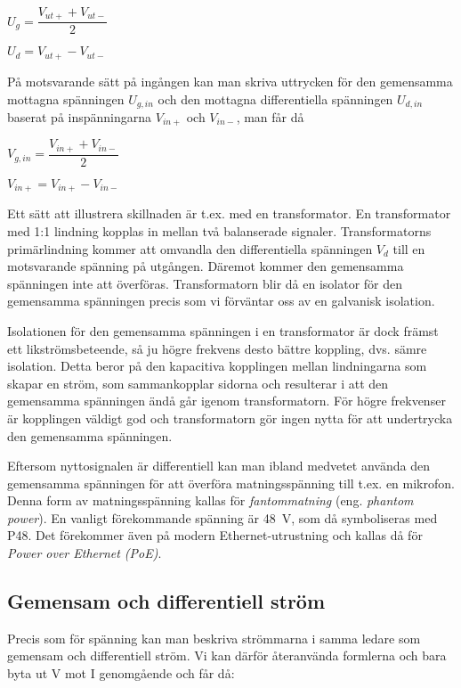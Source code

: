 \(U_g = \dfrac{V_{ut+}+V_{ut-}}{2}\)

\(U_d = {V_{ut+}-V_{ut-}}\)

På motsvarande sätt på ingången kan man skriva uttrycken för den gemensamma
mottagna spänningen \(U_{g,in}\) och den mottagna differentiella spänningen
\(U_{d,in}\) baserat på inspänningarna \(V_{in+}\) och \(V_{in-}\), man får då

\(V_{g,in} = \dfrac{V_{in+} + V_{in-}}{2}\)

\(V_{in+} = V_{in+}-V_{in-}\)

Ett sätt att illustrera skillnaden är t.ex. med en transformator.
En transformator med 1:1 lindning kopplas in mellan två balanserade signaler.
Transformatorns primärlindning kommer att omvandla den differentiella spänningen
\(V_d\) till en motsvarande spänning på utgången.
Däremot kommer den gemensamma spänningen inte att överföras.
Transformatorn blir då en isolator för den gemensamma spänningen precis som vi
förväntar oss av en galvanisk isolation.

Isolationen för den gemensamma spänningen i en transformator är dock främst ett
likströmsbeteende, så ju högre frekvens desto bättre koppling, dvs. sämre
isolation.
Detta beror på den kapacitiva kopplingen mellan lindningarna som skapar en
ström, som sammankopplar sidorna och resulterar i att den gemensamma spänningen
ändå går igenom transformatorn.
För högre frekvenser är kopplingen väldigt god och transformatorn gör ingen
nytta för att undertrycka den gemensamma spänningen.

Eftersom nyttosignalen är differentiell kan man ibland medvetet använda den
gemensamma spänningen för att överföra matningsspänning till t.ex. en mikrofon.
Denna form av matningsspänning kallas för \emph{fantommatning}
(eng. \emph{phantom power}). En vanligt förekommande spänning är 48~V, som då
symboliseras med P48.
Det förekommer även på modern Ethernet-utrustning och kallas då för
\emph{Power over Ethernet (PoE)}.

\subsection{Gemensam och differentiell ström}
\label{comdiffi}

Precis som för spänning kan man beskriva strömmarna i samma ledare som
gemensam och differentiell ström.
Vi kan därför återanvända formlerna och bara byta ut V mot I genomgående och
får då:


